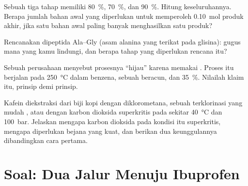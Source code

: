 \begin{exercise}[$\star\star\star$]\label{exo:g12:synthesis-strategy:12}
Sebuah  tiga tahap memiliki  \qty{80}{\percent},
\qty{70}{\percent}, dan \qty{90}{\percent}. Hitung 
keseluruhannya. Berapa jumlah bahan awal yang diperlukan untuk
memperoleh \qty{0.10}{mol} produk akhir, jika satu  bahan awal paling
banyak menghasilkan satu  produk?
\end{exercise}

\begin{exercise}[$\star\star\star$]\label{exo:g12:synthesis-strategy:13}
Rencanakan  dipeptida Ala--Gly (asam alanina yang terikat pada
 glisina): gugus mana yang kamu lindungi, dan berapa tahap yang
diperlukan rencana itu?
\end{exercise}

\begin{exercise}[$\star\star\star$]\label{exo:g12:synthesis-strategy:14}
Sebuah perusahaan menyebut prosesnya ``hijau'' karena memakai .
Proses itu berjalan pada \qty{250}{\celsius} dalam benzena, sebuah
 beracun, dan  \qty{35}{\percent}. Nilailah
klaim itu, prinsip demi prinsip.
\end{exercise}

\begin{exercise}[$\star\star\star$]\label{exo:g12:synthesis-strategy:15}
Kafein diekstraksi dari biji kopi dengan diklorometana, sebuah 
terklorinasi yang mudah , atau dengan karbon dioksida superkritis
pada sekitar \qty{40}{\celsius} dan \qty{100}{bar}. Jelaskan mengapa
karbon dioksida pada kondisi itu superkritis, mengapa diperlukan bejana
yang kuat, dan berikan dua keunggulannya dibandingkan cara pertama.
\end{exercise}

\section{Soal: Dua Jalur Menuju Ibuprofen}


